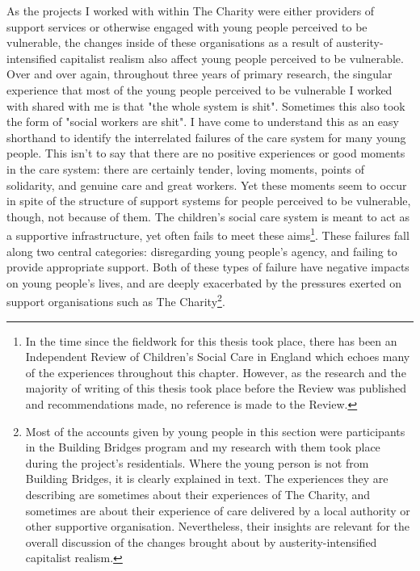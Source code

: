 As the projects I worked with within The Charity were either providers of support services or otherwise engaged with young people perceived to be vulnerable, the changes inside of these organisations as a result of austerity-intensified capitalist realism also affect young people perceived to be vulnerable. Over and over again, throughout three years of primary research, the singular experience that most of the young people perceived to be vulnerable I worked with shared with me is that "the whole system is shit". Sometimes this also took the form of "social workers are shit". I have come to understand this as an easy shorthand to identify the interrelated failures of the care system for many young people. This isn’t to say that there are no positive experiences or good moments in the care system: there are certainly tender, loving moments, points of solidarity, and genuine care and great workers. Yet these moments seem to occur in spite of the structure of support systems for people perceived to be vulnerable, though, not because of them. The children's social care system is meant to act as a supportive infrastructure, yet often fails to meet these aims\footnote{In the time since the fieldwork for this thesis took place, there has been an Independent Review of Children's Social Care in England \citep{macalister_independent_2022} which echoes many of the experiences throughout this chapter. However, as the research and the majority of writing of this thesis took place before the Review was published and recommendations made, no reference is made to the Review.}. These failures fall along two central categories: disregarding young people's agency, and failing to provide appropriate support. Both of these types of failure have negative impacts on young people's lives, and are deeply exacerbated by the pressures exerted on support organisations such as The Charity\footnote{Most of the accounts given by young people in this section were participants in the Building Bridges program and my research with them took place during the project's residentials. Where the young person is not from Building Bridges, it is clearly explained in text. The experiences they are describing are sometimes about their experiences of The Charity, and sometimes are about their experience of care delivered by a local authority or other supportive organisation. Nevertheless, their insights are relevant for the overall discussion of the changes brought about by austerity-intensified capitalist realism.}.

